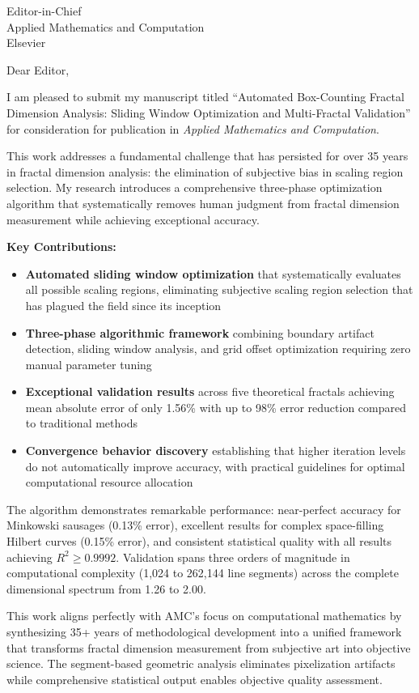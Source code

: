 \documentclass[11pt]{letter}
\begin{document}
\begin{letter}{Editor-in-Chief\\
Applied Mathematics and Computation\\
Elsevier}

\opening{Dear Editor,}

I am pleased to submit my manuscript titled ``Automated Box-Counting Fractal Dimension Analysis: Sliding Window Optimization and Multi-Fractal Validation'' for consideration for publication in \emph{Applied Mathematics and Computation}.

This work addresses a fundamental challenge that has persisted for over 35 years in fractal dimension analysis: the elimination of subjective bias in scaling region selection. My research introduces a comprehensive three-phase optimization algorithm that systematically removes human judgment from fractal dimension measurement while achieving exceptional accuracy.

\textbf{Key Contributions:}
\begin{itemize}
\item \textbf{Automated sliding window optimization} that systematically evaluates all possible scaling regions, eliminating subjective scaling region selection that has plagued the field since its inception
\item \textbf{Three-phase algorithmic framework} combining boundary artifact detection, sliding window analysis, and grid offset optimization requiring zero manual parameter tuning
\item \textbf{Exceptional validation results} across five theoretical fractals achieving mean absolute error of only 1.56\% with up to 98\% error reduction compared to traditional methods
\item \textbf{Convergence behavior discovery} establishing that higher iteration levels do not automatically improve accuracy, with practical guidelines for optimal computational resource allocation
\end{itemize}

The algorithm demonstrates remarkable performance: near-perfect accuracy for Minkowski sausages (0.13\% error), excellent results for complex space-filling Hilbert curves (0.15\% error), and consistent statistical quality with all results achieving $R^2 \geq 0.9992$. Validation spans three orders of magnitude in computational complexity (1,024 to 262,144 line segments) across the complete dimensional spectrum from 1.26 to 2.00.

This work aligns perfectly with AMC's focus on computational mathematics by synthesizing 35+ years of methodological development into a unified framework that transforms fractal dimension measurement from subjective art into objective science. The segment-based geometric analysis eliminates pixelization artifacts while comprehensive statistical output enables objective quality assessment.


\end{letter}
\end{document}
